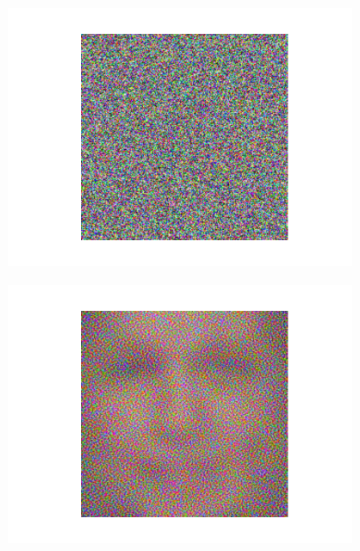 \documentclass[10pt,twocolumn,letterpaper]{article}
\begin{document}
\begin{figure}[h]
    \centering
    \begin{subfigure}[b]{0.24\linewidth}
        \includegraphics[trim={4.5cm 1.5cm 4.5cm 1.5cm},clip, width=\linewidth]{images/outputs/sequence/image-0.png}
    \end{subfigure}
    \begin{subfigure}[b]{0.24\linewidth}
        \includegraphics[trim={4.5cm 1.5cm 4.5cm 1.5cm},clip, width=\linewidth]{images/outputs/sequence/image-10.png}
    \end{subfigure}
    \begin{subfigure}[b]{0.24\linewidth}

\end{subfigure}
\end{figure}
\end{document}
